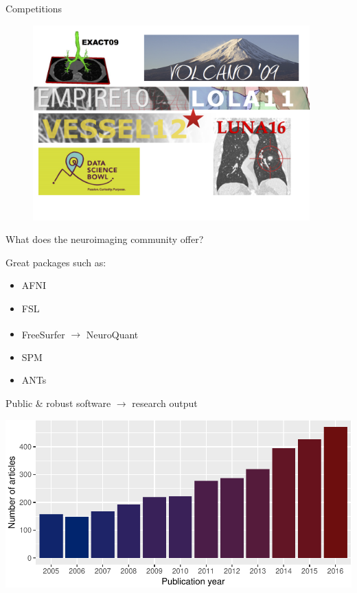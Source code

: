 \documentclass[ignorenonframetext,]{beamer}
\providecommand{\tightlist}{%
  \setlength{\itemsep}{0pt}\setlength{\parskip}{0pt}}
\begin{document}
\begin{frame}{Competitions}

\centering

\begin{figure}
\includegraphics[width=0.95\textwidth]{./Figs/competitions.png}
\end{figure}

\end{frame}

\begin{frame}{What does the neuroimaging community offer?}

Great packages such as:

\begin{itemize}
\tightlist
\item
  AFNI
\item
  FSL
\item
  FreeSurfer \(\longrightarrow\)
  NeuroQuant\textsuperscript{\textregistered}
\item
  SPM
\item
  ANTs
\end{itemize}

\end{frame}

\begin{frame}{Public \& robust software \(\longrightarrow\) research
output}

\includegraphics{stitchedIwpiSlides_files/figure-beamer/pubmedQuery-1.pdf}

\end{frame}
\end{document}
